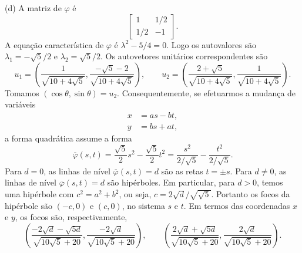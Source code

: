 \documentclass[a4paper,11pt]{article}
\begin{document}
(d)
A matriz de $\varphi$ é
\[
  \begin{bmatrix}
    1 & 1/2 \\
    1/2 & -1
  \end{bmatrix}.
\]
A equação característica de $\varphi$ é $\lambda^2 - 5/4 = 0$.
Logo os autovalores são $\lambda_1 = -\sqrt{5}/2$ e $\lambda_2 = \sqrt{5}/2$.
Os autovetores unitários correspondentes são
\[
  u_1 = \left( \frac{1}{\sqrt{10 + 4\sqrt{5}}}, \frac{-\sqrt{5}-2}{\sqrt{10 + 4\sqrt{5}}} \right), \qquad u_2 = \left( \frac{2+\sqrt{5}}{\sqrt{10 + 4\sqrt{5}}}, \frac{1}{\sqrt{10 + 4\sqrt{5}}} \right).
\]
Tomamos $(\cos \theta, \sin \theta) = u_2$.
Consequentemente, se efetuarmos a mudança de variáveis
\begin{align*}
  x & = a s - b t, \\
  y & = b s + a t,
\end{align*}
a forma quadrática assume a forma
\[
  \overline{\varphi}(s,t) = \frac{\sqrt{5}}{2} s^2 - \frac{\sqrt{5}}{2} t^2 = \frac{s^2}{2/\sqrt{5}} - \frac{t^2}{2/\sqrt{5}}.
\]
Para $d = 0$, as linhas de nível $\overline{\varphi}(s,t) = d$ são as retas $t = \pm s$.
Para $d \neq 0$, as linhas de nível $\overline{\varphi}(s,t) = d$ são hipérboles.
Em particular, para $d > 0$, temos uma hipérbole com $c^2 = a^2 + b^2$, ou seja, $c = 2\sqrt{d}/\sqrt{\sqrt{5}}$.
Portanto os focos da hipérbole são $(-c,0)$ e $(c,0)$, no sistema $s$ e $t$.
Em termos das coordenadas $x$ e $y$, os focos são, respectivamente,
\[
  \left( \frac{-2\sqrt{d} -\sqrt{5d}}{\sqrt{10 \sqrt{5} + 20}}, \frac{-2\sqrt{d}}{\sqrt{10 \sqrt{5} + 20}} \right), \qquad \left( \frac{2\sqrt{d} + \sqrt{5d}}{\sqrt{10 \sqrt{5} + 20}}, \frac{2\sqrt{d}}{\sqrt{10 \sqrt{5} + 20}} \right).
\]
\end{document}
